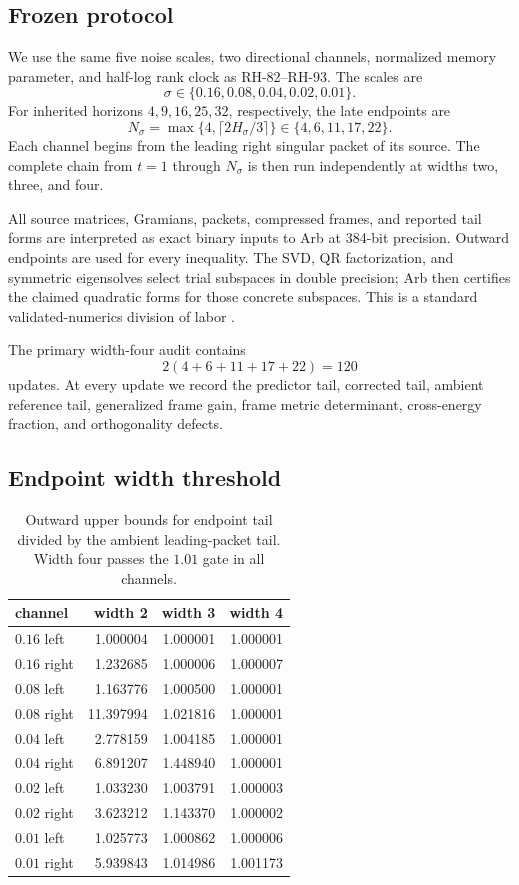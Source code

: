 \documentclass[11pt]{article}
\theoremstyle{definition}
\theoremstyle{remark}
\begin{document}
\subsection{Frozen protocol}

We use the same five noise scales, two directional channels, normalized
memory parameter, and half-log rank clock as RH-82--RH-93.  The scales are
\[
 \sigma\in\{0.16,0.08,0.04,0.02,0.01\}.
\]
For inherited horizons $4,9,16,25,32$, respectively, the late endpoints are
\[
 N_\sigma=\max\{4,\lceil 2H_\sigma/3\rceil\}
 \in\{4,6,11,17,22\}.
\]
Each channel begins from the leading right singular packet of its source.
The complete chain from $t=1$ through $N_\sigma$ is then run independently
at widths two, three, and four.

All source matrices, Gramians, packets, compressed frames, and reported tail
forms are interpreted as exact binary inputs to Arb at 384-bit precision.
Outward endpoints are used for every inequality.  The SVD, QR factorization,
and symmetric eigensolves select trial subspaces in double precision; Arb
then certifies the claimed quadratic forms for those concrete subspaces.
This is a standard validated-numerics division of labor
\citep{Higham2002,Rump2010}.

The primary width-four audit contains
\[
 2(4+6+11+17+22)=120
\]
updates.  At every update we record the predictor tail, corrected tail,
ambient reference tail, generalized frame gain, frame metric determinant,
cross-energy fraction, and orthogonality defects.

\subsection{Endpoint width threshold}

\begin{table}[t]
\centering
\caption{Outward upper bounds for endpoint tail divided by the ambient
leading-packet tail.  Width four passes the $1.01$ gate in all channels.}
\label{tab:endpoints}
\begin{tabular}{@{}lrrr@{}}
\toprule
channel & width 2 & width 3 & width 4\\
\midrule
$0.16$ left  & 1.000004 & 1.000001 & 1.000001\\
$0.16$ right & 1.232685 & 1.000006 & 1.000007\\
$0.08$ left  & 1.163776 & 1.000500 & 1.000001\\
$0.08$ right & 11.397994 & 1.021816 & 1.000001\\
$0.04$ left  & 2.778159 & 1.004185 & 1.000001\\
$0.04$ right & 6.891207 & 1.448940 & 1.000001\\
$0.02$ left  & 1.033230 & 1.003791 & 1.000003\\
$0.02$ right & 3.623212 & 1.143370 & 1.000002\\
$0.01$ left  & 1.025773 & 1.000862 & 1.000006\\
$0.01$ right & 5.939843 & 1.014986 & 1.001173\\
\bottomrule
\end{tabular}
\end{table}
\end{document}
